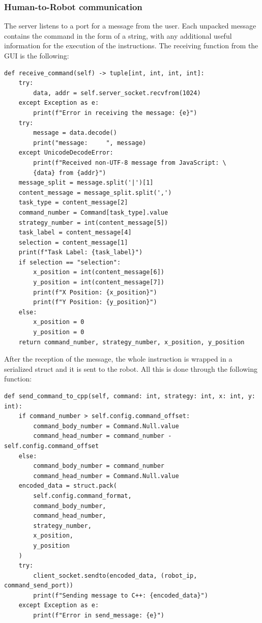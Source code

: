 \documentclass[a4paper, onecolumn, 12pt]{article}
\begin{document}
\subsubsection{Human-to-Robot communication}
The server listens to a port for a message from the user. Each unpacked message contains
the command in the form of a string, with any additional useful information for the execution of the instructions.
The receiving function from the GUI is the following:
\begin{verbatim}
def receive_command(self) -> tuple[int, int, int, int]:
    try:
        data, addr = self.server_socket.recvfrom(1024)
    except Exception as e:
        print(f"Error in receiving the message: {e}")
    try:
        message = data.decode()
        print("message:     ", message)
    except UnicodeDecodeError:
        print(f"Received non-UTF-8 message from JavaScript: \
        {data} from {addr}")
    message_split = message.split('|')[1]
    content_message = message_split.split(',')
    task_type = content_message[2]
    command_number = Command[task_type].value
    strategy_number = int(content_message[5])
    task_label = content_message[4]
    selection = content_message[1]
    print(f"Task Label: {task_label}")
    if selection == "selection":
        x_position = int(content_message[6])
        y_position = int(content_message[7])
        print(f"X Position: {x_position}")
        print(f"Y Position: {y_position}")
    else:
        x_position = 0
        y_position = 0
    return command_number, strategy_number, x_position, y_position
\end{verbatim}

After the reception of the message, the whole instruction is wrapped in a serialized
struct and it is sent to the robot. All this is done through the following function:


\begin{verbatim}
def send_command_to_cpp(self, command: int, strategy: int, x: int, y: int):
    if command_number > self.config.command_offset:
        command_body_number = Command.Null.value
        command_head_number = command_number - self.config.command_offset
    else:
        command_body_number = command_number
        command_head_number = Command.Null.value
    encoded_data = struct.pack(
        self.config.command_format,
        command_body_number,
        command_head_number,
        strategy_number,
        x_position,
        y_position
    )
    try:
        client_socket.sendto(encoded_data, (robot_ip, command_send_port))
        print(f"Sending message to C++: {encoded_data}")
    except Exception as e:
        print(f"Error in send_message: {e}")
\end{verbatim}
\end{document}
